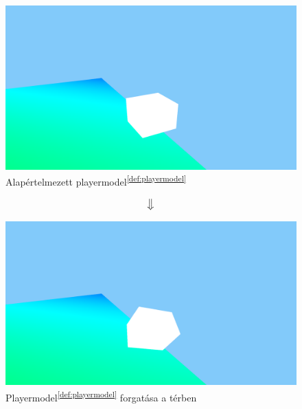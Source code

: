\begin{figure}[h]
	\centering
	\includegraphics[width=13truecm, height=7truecm]{images/modell_4.3.2.1.png}
	\caption{Alapértelmezett playermodel\textsuperscript{\ref{def:playermodel}}}
	\label{fig:forgatas_1}
\end{figure}
$$\big\Downarrow$$
\begin{figure}[h]
	\centering
	\includegraphics[width=13truecm, height=7truecm]{images/modell_4.3.2.3.png}
	\caption{Playermodel\textsuperscript{\ref{def:playermodel}} forgatása a térben}
	\label{fig:forgatas_2}
\end{figure}

\newpage
{}



